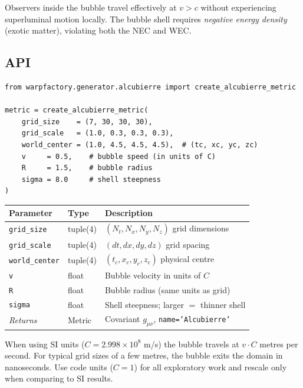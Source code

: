 \documentclass[11pt, a4paper, twoside]{report}
\begin{document}
Observers inside the bubble travel effectively at $v > c$ without
experiencing superluminal motion locally.  The bubble shell requires
\emph{negative energy density} (exotic matter), violating both the NEC
and WEC.

\subsection{API}

\begin{lstlisting}[caption={Alcubierre metric}]
from warpfactory.generator.alcubierre import create_alcubierre_metric

metric = create_alcubierre_metric(
    grid_size    = (7, 30, 30, 30),
    grid_scale   = (1.0, 0.3, 0.3, 0.3),
    world_center = (1.0, 4.5, 4.5, 4.5),  # (tc, xc, yc, zc)
    v     = 0.5,    # bubble speed (in units of C)
    R     = 1.5,    # bubble radius
    sigma = 8.0     # shell steepness
)
\end{lstlisting}

\begin{center}
\begin{tabularx}{\linewidth}{llX}
  \toprule
  Parameter & Type & Description \\
  \midrule
  \texttt{grid\_size}    & tuple(4) & $(N_t, N_x, N_y, N_z)$ grid dimensions \\
  \texttt{grid\_scale}   & tuple(4) & $(dt, dx, dy, dz)$ grid spacing \\
  \texttt{world\_center} & tuple(4) & $(t_c, x_c, y_c, z_c)$ physical centre \\
  \texttt{v}             & float    & Bubble velocity in units of $C$ \\
  \texttt{R}             & float    & Bubble radius (same units as grid) \\
  \texttt{sigma}         & float    & Shell steepness; larger $= $ thinner shell \\
  \midrule
  \emph{Returns}         & Metric   & Covariant $g_{\mu\nu}$, \texttt{name='Alcubierre'} \\
  \bottomrule
\end{tabularx}
\end{center}

\begin{warningbox}
When using SI units ($C = 2.998\times10^8$ m/s) the bubble travels at
$v \cdot C$ metres per second.  For typical grid sizes of a few metres,
the bubble exits the domain in nanoseconds.  Use code units ($C=1$) for
all exploratory work and rescale only when comparing to SI results.
\end{warningbox}
\end{document}
